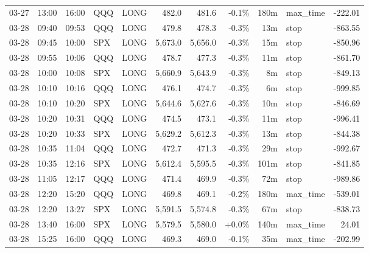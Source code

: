 \documentclass[11pt,a4paper,twoside]{article}
\begin{document}
\begin{center}
\begin{longtable}{>{\color{txtmain}}l l l l l r r r r >{\color{txtmain}}l r}
03-27 & 13:00 & 16:00 & QQQ & LONG & 482.0 & 481.6 & \textcolor{lossred}{-0.1\%} & 180m & max\_time & \textcolor{lossred}{-222.01} \\
03-28 & 09:40 & 09:53 & QQQ & LONG & 479.8 & 478.3 & \textcolor{lossred}{-0.3\%} & 13m & stop & \textcolor{lossred}{-863.55} \\
03-28 & 09:45 & 10:00 & SPX & LONG & 5,673.0 & 5,656.0 & \textcolor{lossred}{-0.3\%} & 15m & stop & \textcolor{lossred}{-850.96} \\
03-28 & 09:55 & 10:06 & QQQ & LONG & 478.7 & 477.3 & \textcolor{lossred}{-0.3\%} & 11m & stop & \textcolor{lossred}{-861.70} \\
03-28 & 10:00 & 10:08 & SPX & LONG & 5,660.9 & 5,643.9 & \textcolor{lossred}{-0.3\%} & 8m & stop & \textcolor{lossred}{-849.13} \\
03-28 & 10:10 & 10:16 & QQQ & LONG & 476.1 & 474.7 & \textcolor{lossred}{-0.3\%} & 6m & stop & \textcolor{lossred}{-999.85} \\
03-28 & 10:10 & 10:20 & SPX & LONG & 5,644.6 & 5,627.6 & \textcolor{lossred}{-0.3\%} & 10m & stop & \textcolor{lossred}{-846.69} \\
03-28 & 10:20 & 10:31 & QQQ & LONG & 474.5 & 473.1 & \textcolor{lossred}{-0.3\%} & 11m & stop & \textcolor{lossred}{-996.41} \\
03-28 & 10:20 & 10:33 & SPX & LONG & 5,629.2 & 5,612.3 & \textcolor{lossred}{-0.3\%} & 13m & stop & \textcolor{lossred}{-844.38} \\
03-28 & 10:35 & 11:04 & QQQ & LONG & 472.7 & 471.3 & \textcolor{lossred}{-0.3\%} & 29m & stop & \textcolor{lossred}{-992.67} \\
03-28 & 10:35 & 12:16 & SPX & LONG & 5,612.4 & 5,595.5 & \textcolor{lossred}{-0.3\%} & 101m & stop & \textcolor{lossred}{-841.85} \\
03-28 & 11:05 & 12:17 & QQQ & LONG & 471.4 & 469.9 & \textcolor{lossred}{-0.3\%} & 72m & stop & \textcolor{lossred}{-989.86} \\
03-28 & 12:20 & 15:20 & QQQ & LONG & 469.8 & 469.1 & \textcolor{lossred}{-0.2\%} & 180m & max\_time & \textcolor{lossred}{-539.01} \\
03-28 & 12:20 & 13:27 & SPX & LONG & 5,591.5 & 5,574.8 & \textcolor{lossred}{-0.3\%} & 67m & stop & \textcolor{lossred}{-838.73} \\
03-28 & 13:40 & 16:00 & SPX & LONG & 5,579.5 & 5,580.0 & \textcolor{wingreen}{+0.0\%} & 140m & max\_time & \textcolor{wingreen}{24.01} \\
03-28 & 15:25 & 16:00 & QQQ & LONG & 469.3 & 469.0 & \textcolor{lossred}{-0.1\%} & 35m & max\_time & \textcolor{lossred}{-202.99} \\

\end{longtable}
\end{center}
\end{document}
